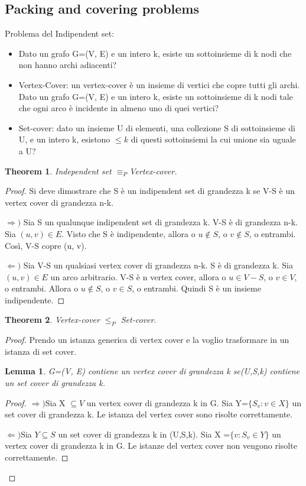 \documentclass{article}
\newtheorem{theorem}{Theorem}[subsection]
\newtheorem{lemma}{Lemma}[subsection]
\begin{document}
\subsection{Packing and covering problems}
Problema del Indipendent set: 
\begin{itemize}
    \item Dato un grafo G=(V, E) e un intero k, esiste un sottoinsieme di k nodi  che non hanno archi adiacenti?
    \item Vertex-Cover: un vertex-cover è un insieme di vertici che copre tutti gli archi. Dato un grafo G=(V, E) e un intero k, esiste un sottoinsieme di k nodi tale che ogni arco è incidente in almeno uno di quei vertici?
    \item Set-cover: dato un insieme U di elementi, una collezione S di sottoinsieme di U, e un intero k, esistono  $\leq k$ di questi sottoinsiemi la cui unione sia uguale a U?
\end{itemize}
\begin{theorem}
    Independent set $\equiv_P$Vertex-cover.
\end{theorem}
\begin{proof}
    Si deve dimostrare che S è un indipendent set di grandezza k se V-S è un vertex cover di grandezza n-k.
    
    \noindent $\Rightarrow )$ Sia S un qualunque indipendent set di grandezza k. V-S è di grandezza n-k. Sia $(u, v)\in E$. Visto che S è indipendente, allora o $u\notin S$, o $v\notin S$, o entrambi. Così, V-S copre (u, v).

     \noindent $\Leftarrow )$ Sia V-S  un qualsiasi vertex cover di grandezza n-k. S è di grandezza k. Sia $(u, v)\in E$ un arco arbitrario. V-S è n vertex cover, allora o $u\in V-S$, o $v\in V$, o entrambi. Allora o $u \notin S$, o $v \in S$, o entrambi. Quindi S è un insieme indipendente.
\end{proof}
\begin{theorem}
    Vertex-cover $\leq_P$ Set-cover.
\end{theorem}
\begin{proof}
    Prendo un istanza generica di vertex cover e la voglio trasformare in un istanza di set cover.
    \begin{lemma}
        G=(V, E) contiene un vertex cover di grandezza k se(U,S,k) contiene un set cover di grandezza k.
    \end{lemma}
    \begin{proof}
       $\Rightarrow)$Sia X $\subseteq V$ un vertex cover di grandezza k in G. Sia Y=$\{S_v:v\in X\}$  un set cover di grandezza k. Le istanza del vertex cover sono risolte correttamente.
       
       \noindent$\Leftarrow)$Sia $Y\subseteq S$ un set cover di grandezza k in (U,S,k). Sia X =$\{v:S_v\in Y\}$ un vertex cover di grandezza k in G. Le istanze del vertex cover non vengono risolte correttamente.
    \end{proof}
\end{proof}
\newpage
\end{document}
